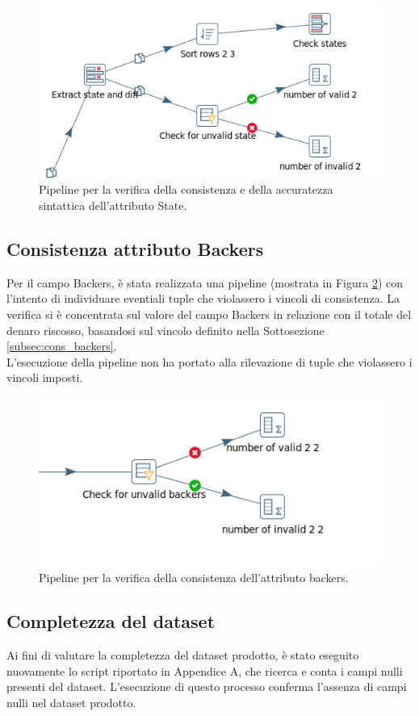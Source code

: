 \begin{figure}[h!]
	\centering
	\includegraphics[width=0.6\linewidth]{images/DQT_state}
	\caption{Pipeline per la verifica della consistenza e della accuratezza sintattica dell'attributo State.}
	\label{fig:dqtstate}
\end{figure}

\subsection{Consistenza attributo Backers}
Per il campo Backers, è stata realizzata una pipeline (mostrata in Figura \ref{fig:dqtbackers}) con l'intento di individuare eventiali tuple che violassero i vincoli di consistenza. La verifica si è concentrata sul valore del campo Backers in relazione con il totale del denaro riscosso, basandosi sul vincolo definito nella Sottosezione \ref{subsec:cons_backers}.\\
L'esecuzione della pipeline non ha portato alla rilevazione di tuple che violassero i vincoli imposti.

\begin{figure}[h!]
	\centering
	\includegraphics[width=0.7\linewidth]{images/DQT_backers}
	\caption{Pipeline per la verifica della consistenza dell'attributo backers.}
	\label{fig:dqtbackers}
\end{figure}

\subsection{Completezza del dataset}
Ai fini di valutare la completezza del dataset prodotto, è stato eseguito nuovamente lo script riportato in Appendice A, che ricerca e conta i campi nulli presenti del dataset. L'esecuzione di questo processo conferma l'assenza di campi nulli nel dataset prodotto.

